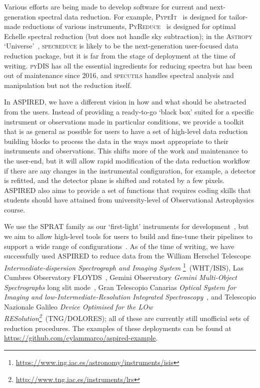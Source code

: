 \documentclass[twocolumn, linenumbers]{aastex631}
\begin{document}
Various efforts are being made to develop software for current and next-generation 
spectral data reduction. For example, \textsc{PypeIt}~\citep{pypeit:zenodo, pypeit:joss_pub}
is designed for tailor-made reductions of various instruments, \textsc{PyReduce}~\citep{2021A&A...646A..32P}
is designed for optimal Echelle spectral reduction (but does not handle sky subtraction);
in the \textsc{Astropy} `Universe'~\citep{astropy:2013, astropy:2018}, \textsc{specreduce}
is likely to be the next-generation user-focused data reduction package, but it is far from
the stage of deployment at the time of writing. \textsc{pyDIS} has all the essential
ingredients for reducing spectra but has been out of maintenance since 2016, and \textsc{specutils}
handles spectral analysis and manipulation but not the reduction itself.

In \textsc{ASPIRED}, we have a different vision in how and what should be abstracted from the
users. Instead of providing a ready-to-go `black box' suited for a specific instrument
or observations made in particular conditions, we provide a toolkit that is as general
as possible for users to have a set of high-level data reduction building blocks to
process the data in the ways most appropriate to their instruments and observations.
This shifts more of the work and maintenance to the user-end, but it will allow rapid
modification of the data reduction workflow if there are any changes in the instrumental
configuration, for example, a detector is refitted, and the detector plane is shifted and
rotated by a few pixels. \textsc{ASPIRED} also aims to provide a set of functions that requires
coding skills that students  should have attained from university-level of Observational
Astrophysics course.

We use the SPRAT family as our `first-light' instruments for development~\citep{2014SPIE.9147E..8HP},
but we aim to allow high-level tools for users to build and fine-tune their pipelines to support
a wide range of configurations~\citep{2020arXiv201203505L, marco_2021_4463569}. As of the time of
writing, we have successfully used \textsc{ASPIRED} to reduce data from the William Herschel Telescope
\textit{Intermediate-dispersion Spectrograph and Imaging System}
\footnote{\url{https://www.ing.iac.es/astronomy/instruments/isis}}~(WHT/ISIS), Las Cumbres
Observatory FLOYDS~\citep[LCO/FLOYDS]{2013PASP..125.1031B}, Gemini Observatory
\textit{Gemini Multi-Object Spectrographs} long slit
mode~\citep[Gemini/GMOS-LS]{2004PASP..116..425H}, Gran Telescopio Canarias \textit{Optical
System for Imaging and low-Intermediate-Resolution Integrated
Spectroscopy}~\citep[GTC/OSIRIS]{2000SPIE.4008..623C}, and Telescopio Nazionale Galileo
\textit{Device Optimised for the LOw
RESolution\footnote{\url{http://www.tng.iac.es/instruments/lrs}}}~(TNG/DOLORES); all of
these are currently still unofficial sets of reduction procedures. The examples of these deployments can be
found at \url{https://github.com/cylammarco/aspired-example}.
\end{document}
